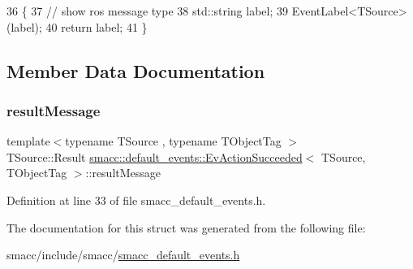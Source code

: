 \begin{DoxyCode}
36   \{
37     \textcolor{comment}{// show ros message type}
38     std::string label;
39     EventLabel<TSource>(label);
40     \textcolor{keywordflow}{return} label;
41   \}
\end{DoxyCode}


\subsection{Member Data Documentation}
\mbox{\label{structsmacc_1_1default__events_1_1EvActionSucceeded_a5178997ebcf9a7a738e0bda57bd658d1}} 
\subsubsection{\texorpdfstring{result\+Message}{resultMessage}}
{\footnotesize\ttfamily template$<$typename T\+Source , typename T\+Object\+Tag $>$ \\
T\+Source\+::\+Result \hyperlink{structsmacc_1_1default__events_1_1EvActionSucceeded}{smacc\+::default\+\_\+events\+::\+Ev\+Action\+Succeeded}$<$ T\+Source, T\+Object\+Tag $>$\+::result\+Message}



Definition at line 33 of file smacc\+\_\+default\+\_\+events.\+h.



The documentation for this struct was generated from the following file\+:\begin{DoxyCompactItemize}
\item 
smacc/include/smacc/\hyperlink{smacc__default__events_8h}{smacc\+\_\+default\+\_\+events.\+h}\end{DoxyCompactItemize}
